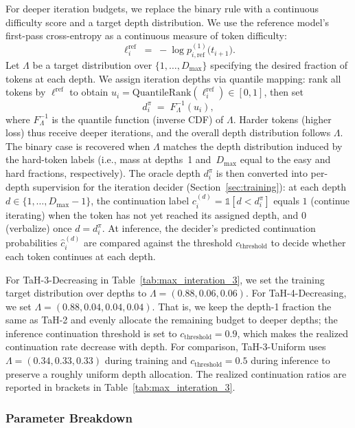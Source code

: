 For deeper iteration budgets, we replace the binary rule with a continuous difficulty score and a target depth distribution.
We use the reference model's first-pass cross-entropy as a continuous measure of token difficulty:
\[
\ell_i^{\text{ref}} \;=\; -\log p_{i,\text{ref}}^{(1)}\!\big(t_{i+1}\big).
\]
Let $\Lambda$ be a target distribution over $\{1,\dots,D_{\max}\}$ specifying the desired fraction of tokens at each depth.
We assign iteration depths via quantile mapping: rank all tokens by $\ell^{\text{ref}}$ to obtain $u_i = \mathrm{QuantileRank}(\ell_i^{\text{ref}}) \in [0,1]$, then set
\begin{equation}
    d_i^\pi \;=\; F_\Lambda^{-1}(u_i),
\end{equation}
where $F_\Lambda^{-1}$ is the quantile function (inverse CDF) of $\Lambda$.
Harder tokens (higher loss) thus receive deeper iterations, and the overall depth distribution follows $\Lambda$.
The binary case is recovered when $\Lambda$ matches the depth distribution induced by the hard-token labels (i.e., mass at depths~1 and~$D_{\max}$ equal to the easy and hard fractions, respectively).
The oracle depth $d_i^\pi$ is then converted into per-depth supervision for the iteration decider (Section~\ref{sec:training}): at each depth $d \in \{1,\ldots,D_{\max}-1\}$, the continuation label $c_i^{(d)} = \mathbb{1}[d < d_i^\pi]$ equals $1$ (continue iterating) when the token has not yet reached its assigned depth, and $0$ (verbalize) once $d = d_i^\pi$.
At inference, the decider's predicted continuation probabilities $\hat{c}_i^{(d)}$ are compared against the threshold $c_{\text{threshold}}$ to decide whether each token continues at each depth.

For TaH-3-Decreasing in Table~\ref{tab:max_interation_3}, we set the training target distribution over depths to $\Lambda=(0.88, 0.06, 0.06)$.
For TaH-4-Decreasing, we set $\Lambda=(0.88, 0.04, 0.04, 0.04)$.
That is, we keep the depth-1 fraction the same as TaH-2 and evenly allocate the remaining budget to deeper depths; the inference continuation threshold is set to $c_{\text{threshold}}=0.9$, which makes the realized continuation rate decrease with depth.
For comparison, TaH-3-Uniform uses $\Lambda=(0.34, 0.33, 0.33)$ during training and $c_{\text{threshold}}=0.5$ during inference to preserve a roughly uniform depth allocation.
The realized continuation ratios are reported in brackets in Table~\ref{tab:max_interation_3}.

\subsubsection{Parameter Breakdown}
\label{sec:appendix/exp_setup/parameter_breakdown}

